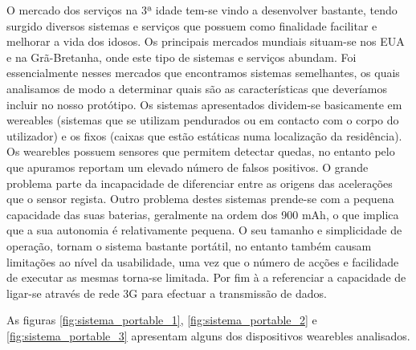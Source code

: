 O mercado dos serviços na 3ª idade tem-se vindo a desenvolver bastante, tendo surgido diversos sistemas e serviços que possuem como finalidade facilitar e melhorar a vida dos idosos. Os principais mercados mundiais situam-se nos EUA e na Grã-Bretanha, onde este tipo de sistemas e serviços abundam. Foi essencialmente nesses mercados que encontramos sistemas semelhantes, os quais analisamos de modo a determinar quais são as características que deveríamos incluir no nosso protótipo.
Os sistemas apresentados dividem-se basicamente em wereables (sistemas que se utilizam pendurados ou em contacto com o corpo do utilizador) e os fixos (caixas que estão estáticas numa localização da residência).
Os wearebles possuem sensores que permitem detectar quedas, no entanto pelo que apuramos reportam um elevado número de falsos positivos. O grande problema parte da incapacidade de diferenciar entre as origens das acelerações que o sensor regista. Outro problema destes sistemas prende-se com a pequena capacidade das suas baterias, geralmente na ordem dos 900 mAh, o que implica que a sua autonomia é relativamente pequena. O seu tamanho e simplicidade de operação, tornam o sistema bastante portátil, no entanto também causam limitações ao nível da usabilidade, uma vez que o número de acções e facilidade de executar as mesmas torna-se limitada. Por fim à a referenciar a capacidade de ligar-se através de rede 3G para efectuar a transmissão de dados.

As figuras \ref{fig:sistema_portable_1}, \ref{fig:sistema_portable_2} e \ref{fig:sistema_portable_3} apresentam alguns dos dispositivos wearebles analisados.

